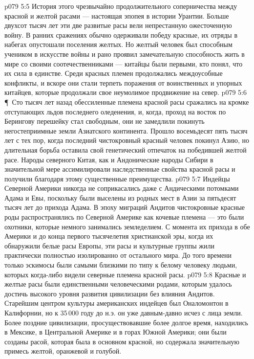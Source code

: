 \vs p079 5:5 История этого чрезвычайно продолжительного соперничества между красной и желтой расами --- настоящая эпопея в истории Урантии. Больше двухсот тысяч лет эти две развитые расы вели непрестанную ожесточенную войну. В ранних сражениях обычно одерживали победу красные, их отряды в набегах опустошали поселения желтых. Но желтый человек был способным учеником в искусстве войны и рано проявил замечательную способность жить в мире со своими соотечественниками --- китайцы были первыми, кто понял, что их сила в единстве. Среди красных племен продолжались междоусобные конфликты, и вскоре они стали терпеть поражения от воинственных и упорных китайцев, которые продолжали свое неумолимое продвижение на север.
\vs p079 5:6 \P\ Сто тысяч лет назад обессиленные племена красной расы сражались на кромке отступающих льдов последнего оледенения, и, когда, проход на восток по Берингову перешейку стал свободным, они не замедлили покинуть негостеприимные земли Азиатского континента. Прошло восемьдесят пять тысяч лет с тех пор, когда последний чистокровный красный человек покинул Азию, но длительная борьба оставила свой генетический отпечаток на победившей желтой расе. Народы северного Китая, как и Андонические народы Сибири в значительной мере ассимилировали наследственные свойства красной расы и получили благодаря этому существенные преимущества.
\vs p079 5:7 Индейцы Северной Америки никогда не соприкасались даже с Андическими потомками Адама и Евы, поскольку были выселены из родных мест в Азии за пятьдесят тысяч лет до прихода Адама. В эпоху миграций Андитов чистокровные красные роды распространялись по Северной Америке как кочевые племена --- это были охотники, которые немного занимались земледелием. С момента их прихода в обе Америки и до конца первого тысячелетия христианской эры, когда их обнаружили белые расы Европы, эти расы и культурные группы жили практически полностью изолированно от остального мира. До того времени только эскимосы были самыми близкими по типу к белому человеку людьми, которых когда\hyp{}либо видели северные племена красной расы.
\vs p079 5:8 Красные и желтые расы были единственными человеческими родами, которым удалось достичь высокого уровня развития цивилизации без влияния Андитов. Старейшим центром культуры американских индейцев был Оналомонтон в Калифорнии, но к 35\,000 году до н.э. он уже давным\hyp{}давно исчез с лица земли. Более поздние цивилизации, просуществовавшие более долгое время, находились в Мексике, в Центральной Америке и в горах Южной Америки; они были созданы расой, которая была в основном красной, но содержала значительную примесь желтой, оранжевой и голубой.
